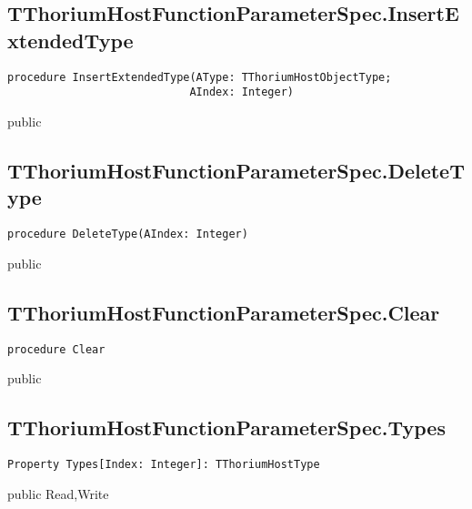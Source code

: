 \subsection{TThoriumHostFunctionParameterSpec.InsertExtendedType}
\label{thoriumcore:thorium:tthoriumhostfunctionparameterspec:insertextendedtype}
\begin{FPCList}
\Synopsis
\Declaration 

\begin{verbatim}
procedure InsertExtendedType(AType: TThoriumHostObjectType;
                            AIndex: Integer)
\end{verbatim}
\Visibility
public
\Description
\Errors
\end{FPCList}
\subsection{TThoriumHostFunctionParameterSpec.DeleteType}
\label{thoriumcore:thorium:tthoriumhostfunctionparameterspec:deletetype}
\begin{FPCList}
\Synopsis
\Declaration 

\begin{verbatim}
procedure DeleteType(AIndex: Integer)
\end{verbatim}
\Visibility
public
\Description
\Errors
\end{FPCList}
\subsection{TThoriumHostFunctionParameterSpec.Clear}
\label{thoriumcore:thorium:tthoriumhostfunctionparameterspec:clear}
\begin{FPCList}
\Synopsis
\Declaration 

\begin{verbatim}
procedure Clear
\end{verbatim}
\Visibility
public
\Description
\Errors
\end{FPCList}
\subsection{TThoriumHostFunctionParameterSpec.Types}
\label{thoriumcore:thorium:tthoriumhostfunctionparameterspec:types}
\begin{FPCList}
\Synopsis
\Declaration 

\begin{verbatim}
Property Types[Index: Integer]: TThoriumHostType
\end{verbatim}
\Visibility
public
\Access
Read,Write
\Description
\end{FPCList}
